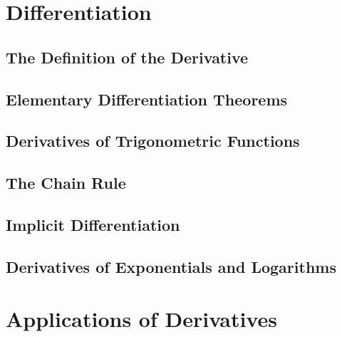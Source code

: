 \documentclass[crop=false,class=book,oneside]{standalone}                      %
\begin{document}
    \section{Differentiation}
        \subsection{The Definition of the Derivative}
        \subsection{Elementary Differentiation Theorems}
        \subsection{Derivatives of Trigonometric Functions}
        \subsection{The Chain Rule}
        \subsection{Implicit Differentiation}
        \subsection{Derivatives of Exponentials and Logarithms}
    \section{Applications of Derivatives}
\end{document}
